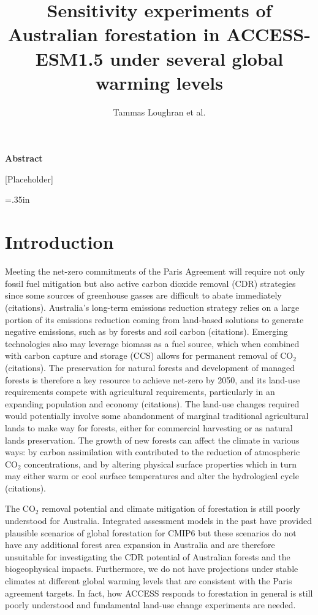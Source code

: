 \documentclass[]{article}
\title{Sensitivity experiments of Australian forestation in ACCESS-ESM1.5 under several global warming levels}
\author{Tammas Loughran et al.}
\begin{document}
\maketitle

\begin{center}
    \Large
    \vspace{0.9cm}
    \textbf{Abstract}
\end{center}

[Placeholder]

\raggedright
\parindent=.35in %

\section{Introduction}

Meeting the net-zero commitments of the Paris Agreement will require not only fossil fuel mitigation but also active carbon dioxide removal (CDR) strategies since some sources of greenhouse gasses are difficult to abate immediately (citations).
Australia's long-term emissions reduction strategy relies on a large portion of its emissions reduction coming from land-based solutions to generate negative emissions, such as by forests and soil carbon (citations).
Emerging technologies also may leverage biomass as a fuel source, which when combined with carbon capture and storage (CCS) allows for permanent removal of CO$_2$ (citations).
The preservation for natural forests and development of managed forests is therefore a key resource to achieve net-zero by 2050, and its land-use requirements compete with agricultural requirements, particularly in an expanding population and economy (citations).
The land-use changes required would potentially involve some abandonment of marginal traditional agricultural lands to make way for forests, either for commercial harvesting or as natural lands preservation.
The growth of new forests can affect the climate in various ways: by carbon assimilation with contributed to the reduction of atmospheric CO$_2$ concentrations, and by altering physical surface properties which in turn may either warm or cool surface temperatures and alter the hydrological cycle (citations).

The CO$_2$ removal potential and climate mitigation of forestation is still poorly understood for Australia.
Integrated assessment models in the past have provided plausible scenarios of global forestation for CMIP6 but these scenarios do not have any additional forest area expansion in Australia \cite{loughran-limited-nodate} and are therefore unsuitable for investigating the CDR potential of Australian forests and the biogeophysical impacts.
Furthermore, we do not have projections under stable climates at different global warming levels that are consistent with the Paris agreement targets.
In fact, how ACCESS responds to forestation in general is still poorly understood and fundamental land-use change experiments are needed.
\end{document}
